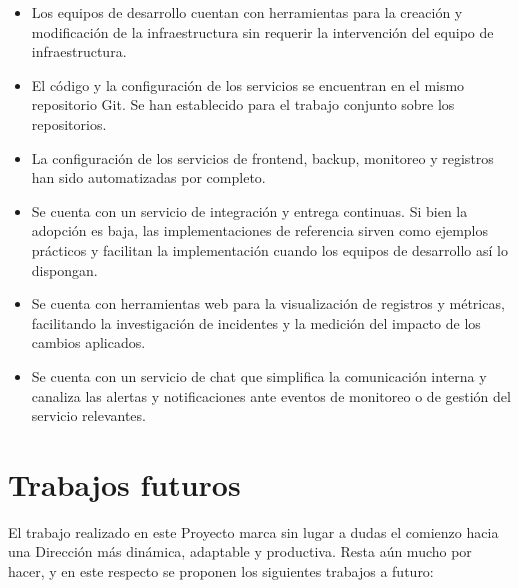 \begin{itemize}
\item Los equipos de desarrollo cuentan con herramientas para la
  creación y modificación de la infraestructura sin requerir la
  intervención del equipo de infraestructura.
\item El código y la configuración de los servicios se encuentran en
  el mismo repositorio Git. Se han establecido para el trabajo
  conjunto sobre los repositorios.
\item La configuración de los servicios de frontend, backup, monitoreo
  y registros han sido automatizadas por completo.
\item Se cuenta con un servicio de integración y entrega continuas. Si
  bien la adopción es baja, las implementaciones de referencia sirven
  como ejemplos prácticos y facilitan la implementación cuando los
  equipos de desarrollo así lo dispongan.
\item Se cuenta con herramientas web para la visualización de
  registros y métricas, facilitando la investigación de incidentes y
  la medición del impacto de los cambios aplicados.
\item Se cuenta con un servicio de chat que simplifica la comunicación
  interna y canaliza las alertas y notificaciones ante eventos de
  monitoreo o de gestión del servicio relevantes.
\end{itemize}
\section{Trabajos futuros}

El trabajo realizado en este Proyecto marca sin lugar a dudas el
comienzo hacia una Dirección más dinámica, adaptable y
productiva. Resta aún mucho por hacer, y en este respecto se proponen
los siguientes trabajos a futuro:

